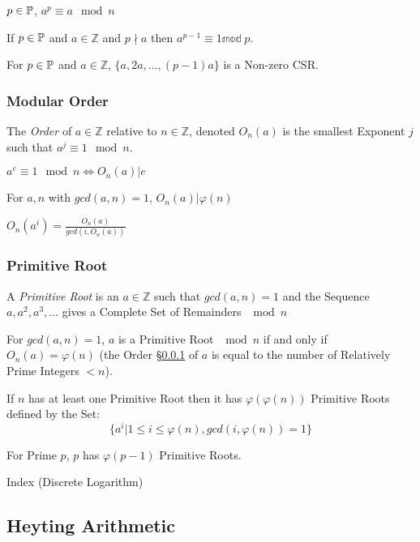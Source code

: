 $p \in \mathbb{P}$, $a^p \equiv a \mod n$

If $p \in \mathbb{P}$ and $a \in \mathbb{Z}$ and $p \nmid a$ then
$a^{p-1} \equiv 1 \mathbb{mod}\;p$.

For $p \in \mathbb{P}$ and $a \in \mathbb{Z}$, $\{ a, 2a, \ldots, (p-1)a
\}$ is a Non-zero CSR.



\subsubsection{Modular Order}\label{sec:modular_order}

The \emph{Order} of $a \in \mathbb{Z}$ relative to $n \in \mathbb{Z}$,
denoted $O_n(a)$ is the smallest Exponent $j$ such that $a^j \equiv 1
\mod n$.

$a^e \equiv 1 \mod n \Leftrightarrow O_n(a) | e$

For $a, n$ with $gcd(a,n) = 1$, $O_n(a) | \varphi(n)$

$O_n(a^i) = \frac{O_n(a)}{gcd(i,O_n(a))}$



\subsubsection{Primitive Root}\label{sec:primitive_root}

A \emph{Primitive Root} is an $a \in \mathbb{Z}$ such that $gcd(a,n) =
1$ and the Sequence $a, a^2, a^3, \ldots$ gives a Complete Set of
Remainders $\mod n$

For $gcd(a,n) = 1$, $a$ is a Primitive Root $\mod n$ if and only if
$O_n(a) = \varphi(n)$ (the Order \S\ref{sec:modular_order} of $a$ is
equal to the number of Relatively Prime Integers $< n$).

If $n$ has at least one Primitive Root then it has
$\varphi(\varphi(n))$ Primitive Roots defined by the Set:
\[
  \{ a^i | 1 \leq i \leq \varphi(n), gcd(i,\varphi(n)) = 1 \}
\]

For Prime $p$, $p$ has $\varphi(p-1)$ Primitive Roots.

Index (Discrete Logarithm) %



\subsection{Heyting Arithmetic}\label{sec:heyting_arithmetic}

